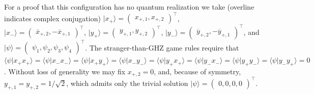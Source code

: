 \documentclass[sn-mathphys]{sn-jnl}%
\theoremstyle{thmstyleone}%
\theoremstyle{thmstyletwo}%
\theoremstyle{thmstylethree}%
\begin{document}
For a proof that this configuration has no quantum realization
we take (overline indicates complex conjugation)
$\vert x_+ \rangle =\begin{pmatrix} x_{+,1} , x_{+,2} \end{pmatrix}^\intercal$,
$\vert x_- \rangle =\begin{pmatrix} \overline{x}_{+,2} , -\overline{x}_{+,1}  \end{pmatrix}^\intercal$,
$\vert y_+ \rangle =\begin{pmatrix} y_{+,1} , y_{+,2} \end{pmatrix}^\intercal$,
$\vert y_- \rangle =\begin{pmatrix} \overline{y}_{+,2} , -\overline{y}_{+,1}  \end{pmatrix}^\intercal$,
and $\vert \psi \rangle = \begin{pmatrix} \psi_1,\psi_2,\psi_3,\psi_4 \end{pmatrix}^\intercal$.
The stranger-than-GHZ game rules require that
$
\langle  \psi  \vert  x_+ x_+ \rangle =
\langle  \psi  \vert  x_- x_- \rangle =
\langle  \psi  \vert  x_+ y_+ \rangle =
\langle  \psi  \vert  x_- y_- \rangle =
\langle  \psi  \vert  y_+ x_+ \rangle =
\langle  \psi  \vert  y_- x_- \rangle =
\langle  \psi  \vert  y_+ y_- \rangle =
\langle  \psi  \vert  y_- y_+ \rangle = 0$.
Without loss of generality we may fix $x_{+,2}=0$, and, because of symmetry, $y_{+,1} = y_{+,2} = 1/\sqrt{2}$,
which admits only the trivial solution  $\vert \psi \rangle = \begin{pmatrix}0,0,0,0 \end{pmatrix}^\intercal$.
\end{document}
